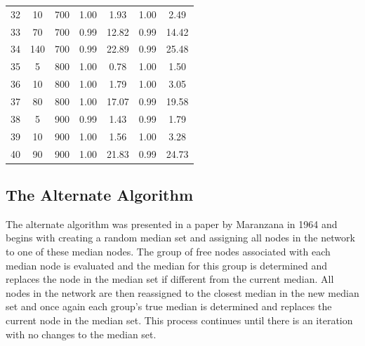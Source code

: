 \documentclass[11pt]{article}
\begin{document}
\begin{table}[]
\begin{tabular}{ccccccc}
			\rowcolor[HTML]{EFEFEF} 
			32 & 10 & 700 & 1.00 & 1.93 & 1.00 & 2.49 \\
			\rowcolor[HTML]{EFEFEF} 
			33 & 70 & 700 & 0.99 & 12.82 & 0.99 & 14.42 \\
			\rowcolor[HTML]{EFEFEF} 
			34 & 140 & 700 & 0.99 & 22.89 & 0.99 & 25.48 \\
			35 & 5 & 800 & 1.00 & 0.78 & 1.00 & 1.50 \\
			36 & 10 & 800 & 1.00 & 1.79 & 1.00 & 3.05 \\
			37 & 80 & 800 & 1.00 & 17.07 & 0.99 & 19.58 \\
			\rowcolor[HTML]{EFEFEF} 
			38 & 5 & 900 & 0.99 & 1.43 & 0.99 & 1.79 \\
			\rowcolor[HTML]{EFEFEF} 
			39 & 10 & 900 & 1.00 & 1.56 & 1.00 & 3.28 \\
			\rowcolor[HTML]{EFEFEF} 
			40 & 90 & 900 & 1.00 & 21.83 & 0.99 & 24.73
		\end{tabular}
	\end{table}
	
	
	\subsection{The Alternate Algorithm} \label{alternatealgo}
	The alternate algorithm was presented in a paper by Maranzana  in 1964 \cite{MARA64} and begins with creating a random median set and assigning all nodes in the network to one of these median nodes.  The group of free nodes associated with each median node is evaluated and the median for this group is determined and replaces the node in the median set if different from the current median.  All nodes in the network are then reassigned to the closest median in the new median set and once again each group's true median is determined and replaces the current node in the median set.  This process continues until there is an iteration with no changes to the median set.
	
\end{document}

